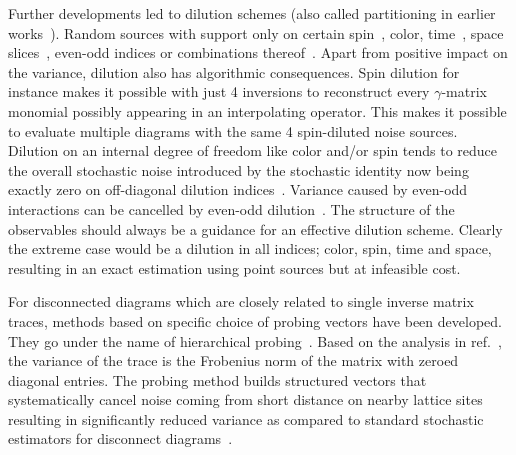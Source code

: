 Further developments led to dilution schemes (also called partitioning in earlier works~\cite{Wilcox:1999ab}).
Random sources with support only on certain spin~\cite{Wilcox:1997rm,Alexandrou:2010jr}, color, time~\cite{GUSKEN1989,OCais:2004xgm,Bali:2014pva}, space slices~\cite{Foley:2005ac}, even-odd indices or combinations thereof~\cite{Morningstar:2008mc,Bulava:2008qx,Foley:2010vv,Morningstar:2008ph}.
Apart from positive impact on the variance, dilution also has algorithmic consequences.
Spin dilution for instance makes it possible with just \num{4} inversions to reconstruct every $\gamma$-matrix monomial possibly appearing in an interpolating operator.
This makes it possible to evaluate multiple diagrams with the same \num{4} spin-diluted noise sources.
Dilution on an internal degree of freedom like color and/or spin tends to reduce the overall stochastic noise introduced by the stochastic identity now being exactly zero on off-diagonal dilution indices~\cite{Babich:2010at,Morningstar:2011ka}.
Variance caused by even-odd interactions can be cancelled by even-odd dilution~\cite{Bali_2009,Foley:2005ac,Morningstar:2011ka}.
The structure of the observables should always be a guidance for an effective dilution scheme.
Clearly the extreme case would be a dilution in all indices; color, spin, time and space, resulting in an exact estimation using point sources but at infeasible cost.

For disconnected diagrams which are closely related to single inverse matrix traces, methods based on specific choice of probing vectors have been developed.
They go under the name of hierarchical probing~\cite{tang2012probing,Stathopoulos:2013aci}.
Based on the analysis in ref.~\cite{Hutchinson01011990}, the variance of the trace is the Frobenius norm of the matrix with zeroed diagonal entries.
The probing method builds structured vectors that systematically cancel noise coming from short distance on nearby lattice sites resulting in significantly reduced variance as compared to standard stochastic estimators for disconnect diagrams~\cite{Stathopoulos:2013aci}.


